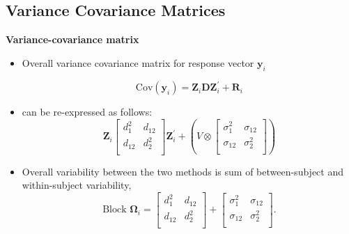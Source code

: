 \documentclass[compress]{beamer}        %
\makeatletter
\newcommand{\tcb}{\textcolor{beamer@blendedblue}}
\makeatother
\begin{document}
\subsection*{Variance Covariance Matrices}
\begin{frame}{\bf \tcb{Variance-covariance matrix}}
\begin{itemize}
\item Overall variance covariance matrix for response vector $\boldsymbol{y}_i$

\[ \mbox{Cov}(\boldsymbol{y}_i)= \boldsymbol{Z}_i \boldsymbol{D}\boldsymbol{Z}^{\prime}_i + \boldsymbol{R}_i \]

\item can be re-expressed as follows:
\[\boldsymbol{Z}_i \left[ \begin{array}{cc} d^2_1 & d_{12}\\
d_{12} & d^2_2\\ \end{array}\right]\boldsymbol{Z}^{\prime}_i  +  \left(V \otimes \left[\begin{array}{cc} \sigma^2_1 & \sigma_{12}\\
\sigma_{12} & \sigma^2_2\\ \end{array}\right] \right)
\]

\item Overall variability between the two methods is sum of between-subject and within-subject variability,
\[
 \mbox{Block } \boldsymbol{\Omega}_i = \left[ \begin{array}{cc} d^2_1 & d_{12}\\ d_{12} & d^2_2\\ \end{array} \right]
+ \left[\begin{array}{cc} \sigma^2_1 & \sigma_{12}\\ \sigma_{12} & \sigma^2_2\\ \end{array}\right].
\]

\end{itemize}
\end{frame}
\end{document}
